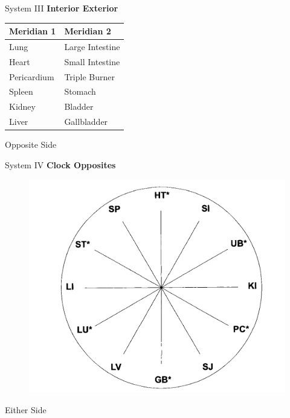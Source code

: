 \documentclass{beamer}
\begin{document}
\begin{frame}{System III}
  \textbf{\Large Interior Exterior}
  \begin{table}[]
    \begin{tabular}{@{}ll@{}}
      \toprule
      Meridian 1  & Meridian 2      \\ \midrule
      Lung        & Large Intestine \\
      Heart       & Small Intestine \\
      Pericardium & Triple Burner   \\
      Spleen      & Stomach         \\
      Kidney      & Bladder         \\
      Liver       & Gallbladder     \\ \bottomrule
    \end{tabular}
  \end{table}

  \begin{ns}
    Opposite Side
  \end{ns}
\end{frame}

\begin{frame}{System IV}
  \textbf{\Large Clock Opposites}

  \begin{figure}
    \centering
    \includegraphics[height=0.5\textheight]{img/mclock.png}
  \end{figure}

  \begin{ns}
    Either Side
  \end{ns}
\end{frame}
\end{document}
